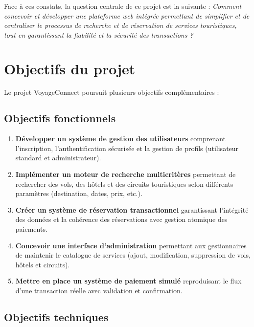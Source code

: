 \documentclass[12pt,a4paper]{report}
\begin{document}
Face à ces constats, la question centrale de ce projet est la suivante : \textit{Comment concevoir et développer une plateforme web intégrée permettant de simplifier et de centraliser le processus de recherche et de réservation de services touristiques, tout en garantissant la fiabilité et la sécurité des transactions ?}

\section*{Objectifs du projet}

Le projet VoyageConnect poursuit plusieurs objectifs complémentaires :

\subsection*{Objectifs fonctionnels}

\begin{enumerate}
    \item \textbf{Développer un système de gestion des utilisateurs} comprenant l'inscription, l'authentification sécurisée et la gestion de profils (utilisateur standard et administrateur).
    
    \item \textbf{Implémenter un moteur de recherche multicritères} permettant de rechercher des vols, des hôtels et des circuits touristiques selon différents paramètres (destination, dates, prix, etc.).
    
    \item \textbf{Créer un système de réservation transactionnel} garantissant l'intégrité des données et la cohérence des réservations avec gestion atomique des paiements.
    
    \item \textbf{Concevoir une interface d'administration} permettant aux gestionnaires de maintenir le catalogue de services (ajout, modification, suppression de vols, hôtels et circuits).
    
    \item \textbf{Mettre en place un système de paiement simulé} reproduisant le flux d'une transaction réelle avec validation et confirmation.
\end{enumerate}

\subsection*{Objectifs techniques}
\end{document}
